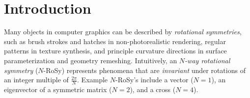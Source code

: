 \documentclass{acmsiggraph}               %
\begin{document}
\section{Introduction}
\label{sec:intro}




Many objects in computer graphics can be described by {\em
rotational symmetries}, such as brush strokes and hatches in
non-photorealistic rendering, regular patterns in texture synthesis,
and principle curvature directions in surface parameterization and
geometry remeshing. Intuitively, an {\em $N$-way rotational
symmetry} ($N$-RoSy) represents phenomena that are {\em invariant}
under rotations of an integer multiple of $\frac{2\pi}{N}$. Example
$N$-RoSy's include a vector ($N=1$), an eigenvector of a symmetric
matrix ($N=2$), and a cross ($N=4$). %
\end{document}
